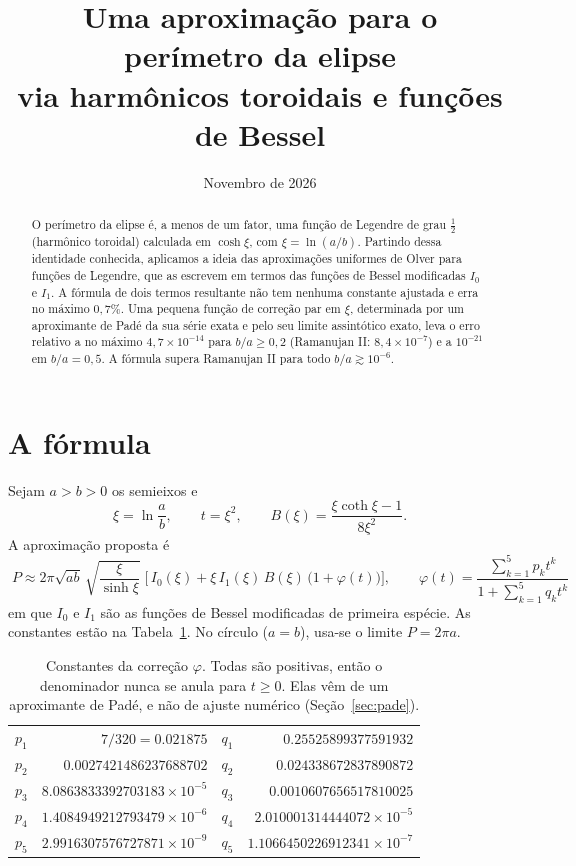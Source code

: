 \documentclass[11pt,a4paper]{article}
\title{Uma aproximação para o perímetro da elipse\\ via harmônicos toroidais e funções de Bessel}
\author{}
\date{Novembro de 2026}
\theoremstyle{remark}
\begin{document}
\maketitle

\begin{abstract}
O perímetro da elipse é, a menos de um fator, uma função de Legendre de grau
$\tfrac12$ (harmônico toroidal) calculada em $\cosh\xi$, com $\xi=\ln(a/b)$. Partindo
dessa identidade conhecida, aplicamos a ideia das aproximações uniformes de
Olver para funções de Legendre, que as escrevem em termos das funções de Bessel
modificadas $I_0$ e $I_1$. A fórmula de dois termos resultante não tem nenhuma constante ajustada e
erra no máximo $0{,}7\%$. Uma pequena função de correção par em $\xi$,
determinada por um aproximante de Padé da sua série exata e pelo seu limite
assintótico exato, leva o erro relativo a no máximo $4{,}7\times10^{-14}$ para
$b/a\ge0{,}2$ (Ramanujan II: $8{,}4\times10^{-7}$) e a $10^{-21}$ em $b/a=0{,}5$.
A fórmula supera Ramanujan II para todo $b/a\gtrsim10^{-6}$.
\end{abstract}

\section{A fórmula}

Sejam $a>b>0$ os semieixos e
\begin{equation}
\xi=\ln\frac ab,\qquad t=\xi^2,\qquad
B(\xi)=\frac{\xi\coth\xi-1}{8\xi^2}.
\end{equation}
A aproximação proposta é
\begin{equation}\label{eq:formula}
\boxed{\;
P\approx2\pi\sqrt{ab}\,\sqrt{\frac{\xi}{\sinh\xi}}\;
\Big[\,I_0(\xi)+\xi\,I_1(\xi)\,B(\xi)\,\big(1+\varphi(t)\big)\Big],
\qquad
\varphi(t)=\frac{\sum_{k=1}^{5}p_kt^k}{1+\sum_{k=1}^{5}q_kt^k}\;}
\end{equation}
em que $I_0$ e $I_1$ são as funções de Bessel modificadas de primeira espécie. As
constantes estão na Tabela~\ref{tab:c}. No círculo ($a=b$), usa-se o limite $P=2\pi a$.

\begin{table}[H]
\centering
\begin{tabular}{lr@{\qquad}lr}
\toprule
$p_1$ & $7/320=0.021875$ & $q_1$ & $0.25525899377591932$\\
$p_2$ & $0.0027421486237688702$ & $q_2$ & $0.024338672837890872$\\
$p_3$ & $8.0863833392703183\times10^{-5}$ & $q_3$ & $0.0010607656517810025$\\
$p_4$ & $1.4084949212793479\times10^{-6}$ & $q_4$ & $2.010001314444072\times10^{-5}$\\
$p_5$ & $2.9916307576727871\times10^{-9}$ & $q_5$ & $1.1066450226912341\times10^{-7}$\\
\bottomrule
\end{tabular}
\caption{Constantes da correção $\varphi$. Todas são positivas, então o denominador
nunca se anula para $t\ge0$. Elas vêm de um aproximante de Padé, e não de ajuste numérico (Seção~\ref{sec:pade}).}
\label{tab:c}
\end{table}
\end{document}
